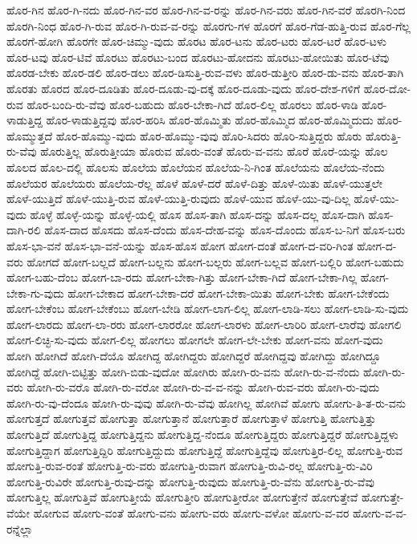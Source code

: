 {ಹೊರ-ಗಿನ
ಹೊರ-ಗಿ-ನದು
ಹೊರ-ಗಿನ-ವರ
ಹೊರ-ಗಿನ-ವ-ರನ್ನು
ಹೊರ-ಗಿನ-ವರು
ಹೊರ-ಗಿನ-ವರೆ
ಹೊರಗಿ-ನಿಂದ
ಹೊರಗಿ-ನಿಂಧ
ಹೊರ-ಗಿ-ರುವ
ಹೊರ-ಗಿ-ರುವ-ವ-ರನ್ನು
ಹೊರಗು-ಗಳ
ಹೊರಗೆ
ಹೊರ-ಗೆಡ-ಹುತ್ತಿ-ರುವ
ಹೊರ-ಗೆಲ್ಲ
ಹೊರಗೆ-ಹೋಗಿ
ಹೊರಗೇ
ಹೊರ-ಚಿಮ್ಮು-ವುದು
ಹೊರಟ
ಹೊರ-ಟನು
ಹೊರ-ಟರು
ಹೊರ-ಟರೆ
ಹೊರ-ಟಳು
ಹೊರ-ಟವು
ಹೊರ-ಟಿವೆ
ಹೊರಟು
ಹೊರಟು-ಬಂದ
ಹೊರಟು-ಹೋದನು
ಹೊರಟು-ಹೋಯಿತು
ಹೊರ-ಟೆವು
ಹೊರಡ-ಬೇಕು
ಹೊರ-ಡಲಿ
ಹೊರ-ಡಲು
ಹೊರ-ಡಿಸುತ್ತಿ-ರುವ-ವಳು
ಹೊರ-ಡುತ್ತೀರಿ
ಹೊರ-ಡು-ವನು
ಹೊರ-ತಾಗಿ
ಹೊರತು
ಹೊರದ
ಹೊರ-ದೂಡಿತು
ಹೊರ-ದೂಡು-ವು-ದಕ್ಕೆ
ಹೊರ-ದೂಡು-ವುದು
ಹೊರ-ದೇಶ-ಗಳಿಗೆ
ಹೊರ-ದೋ-ರುವ
ಹೊರ-ಬಂದಿ-ರು-ವೆವು
ಹೊರ-ಬಹುದು
ಹೊರ-ಬೇಕಾ-ಗಿದೆ
ಹೊರ-ಲಿಲ್ಲ
ಹೊರಲು
ಹೊರ-ಳಾಡಿ
ಹೊರ-ಳಾಡುತ್ತಿದ್ದ
ಹೊರ-ಳಾಡುತ್ತಿದ್ದವು
ಹೊರ-ಹರಿಸಿ
ಹೊರ-ಹೊಮ್ಮಿತು
ಹೊರ-ಹೊಮ್ಮಿದ
ಹೊರ-ಹೊಮ್ಮಿದುದು
ಹೊರ-ಹೊಮ್ಮುತ್ತದೆ
ಹೊರ-ಹೊಮ್ಮು-ವುದು
ಹೊರ-ಹೊಮ್ಮು-ವುವು
ಹೊರಿ-ಸಿದರು
ಹೊರಿ-ಸುತ್ತಿದ್ದರು
ಹೊರು
ಹೊರುತ್ತಿ-ರು-ವೆವು
ಹೊರುತ್ತಿಲ್ಲ
ಹೊರುತ್ತೀಯಾ
ಹೊರುವ
ಹೊರು-ವಂತೆ
ಹೊರು-ವ-ವನು
ಹೊರೆ
ಹೊರೆ-ಯನ್ನು
ಹೊಲ
ಹೊಲದ
ಹೊಲ-ದಲ್ಲಿ
ಹೊಲಸು
ಹೊಲೆಯ
ಹೊಲೆಯನ
ಹೊಲೆಯ-ನಿ-ಗಿಂತ
ಹೊಲೆಯನು
ಹೊಲೆಯ-ನೆಂದು
ಹೊಲೆಯರ
ಹೊಲೆಯರು
ಹೊಲೆಯ-ರೆಲ್ಲ
ಹೊಳೆ
ಹೊಳೆ-ದರೆ
ಹೊಳೆ-ದಿತ್ತು
ಹೊಳೆ-ಯಿತು
ಹೊಳೆ-ಯುತ್ತಲೇ
ಹೊಳೆ-ಯುತ್ತಿದೆ
ಹೊಳೆ-ಯುತ್ತಿ-ರುವ
ಹೊಳೆ-ಯುತ್ತಿ-ರುವುದು
ಹೊಳೆ-ಯುವ
ಹೊಳೆ-ಯು-ವು-ದಿಲ್ಲ
ಹೊಳೆ-ಯು-ವುದು
ಹೊಳ್ಳೆ
ಹೊಳ್ಳೆ-ಯನ್ನು
ಹೊಳ್ಳೆ-ಯಲ್ಲಿ
ಹೊಸ
ಹೊಸ-ತಾಗಿ
ಹೊಸ-ದನ್ನು
ಹೊಸ-ದಲ್ಲ
ಹೊಸ-ದಾಗಿ
ಹೊಸ-ದಾಗಿ-ರಲಿ
ಹೊಸ-ದಾದ
ಹೊಸದು
ಹೊಸ-ದೆಂದು
ಹೊಸ-ದೇಹ-ವನ್ನು
ಹೊಸ-ದೊಂದು
ಹೊಸ-ಬ-ನಿಗೆ
ಹೊಸ-ಬರು
ಹೊಸ-ಭಾ-ವನೆ
ಹೊಸ-ಭಾ-ವನೆ-ಯನ್ನು
ಹೊಸ-ಹೊಸ
ಹೋಗ
ಹೋಗ-ದಂತೆ
ಹೋಗ-ದ-ವರಿ-ಗಿಂತ
ಹೋಗ-ದ-ವರು
ಹೋಗದೆ
ಹೋಗ-ಬಲ್ಲದೆ
ಹೋಗ-ಬಲ್ಲನು
ಹೋಗ-ಬಲ್ಲರು
ಹೋಗ-ಬಲ್ಲವ
ಹೋಗ-ಬಲ್ಲಿರಿ
ಹೋಗ-ಬಹುದು
ಹೋಗ-ಬಹು-ದೆಂಬ
ಹೋಗ-ಬಾ-ರದು
ಹೋಗ-ಬೇಕಾ-ಗಿತ್ತು
ಹೋಗ-ಬೇಕಾ-ಗಿದೆ
ಹೋಗ-ಬೇಕಾ-ಗಿಲ್ಲ
ಹೋಗ-ಬೇಕಾ-ಗು-ವುದು
ಹೋಗ-ಬೇಕಾದ
ಹೋಗ-ಬೇಕಾ-ದರೆ
ಹೋಗ-ಬೇಕಾ-ಯಿತು
ಹೋಗ-ಬೇಕು
ಹೋಗ-ಬೇಕೆಂದು
ಹೋಗ-ಬೇಕೆಂಬ
ಹೋಗ-ಬೇಕೆಂಬು
ಹೋಗ-ಬೇಡಿ
ಹೋಗ-ಲಾಗ-ಲಿಲ್ಲ
ಹೋಗ-ಲಾಡಿ-ಸಲು
ಹೋಗ-ಲಾಡಿ-ಸು-ವುದು
ಹೋಗ-ಲಾರದು
ಹೋಗ-ಲಾ-ರರು
ಹೋಗ-ಲಾರರೋ
ಹೋಗ-ಲಾರಳು
ಹೋಗ-ಲಾರಿರಿ
ಹೋಗ-ಲಾರೆವು
ಹೋಗಲಿ
ಹೋಗ-ಲಿಚ್ಛಿ-ಸು-ವುದು
ಹೋಗ-ಲಿಲ್ಲ
ಹೋಗಲು
ಹೋಗಲೇ
ಹೋಗ-ಲೇ-ಬೇಕು
ಹೋಗ-ವನು
ಹೋಗ-ವುದು
ಹೋಗಿ
ಹೋಗಿದೆ
ಹೋಗಿ-ದೆಯೊ
ಹೋಗಿದ್ದ
ಹೋಗಿದ್ದರು
ಹೋಗಿದ್ದರೆ
ಹೋಗಿದ್ದವು
ಹೋಗಿದ್ದು
ಹೋಗಿದ್ದೂ
ಹೋಗಿದ್ದೆ
ಹೋಗಿ-ಬಿಟ್ಟಿತ್ತು
ಹೋಗಿ-ಬಿಡು-ವುದೋ
ಹೋಗಿರು
ಹೋಗಿ-ರು-ವನು
ಹೋಗಿ-ರು-ವ-ನೆಂದು
ಹೋಗಿ-ರು-ವರು
ಹೋಗಿ-ರು-ವರೊ
ಹೋಗಿ-ರು-ವರೋ
ಹೋಗಿ-ರು-ವ-ವ-ನನ್ನು
ಹೋಗಿ-ರುವ-ವರು
ಹೋಗಿ-ರು-ವುದು
ಹೋಗಿ-ರು-ವು-ದೆಂದೂ
ಹೋಗಿ-ರು-ವುವು
ಹೋಗಿ-ರು-ವೆವು
ಹೋಗಿಲ್ಲ
ಹೋಗಿವೆ
ಹೋಗು
ಹೋಗು-ತಿ-ತ-ರು-ವನು
ಹೋಗುತ್ತದೆ
ಹೋಗುತ್ತವೆ
ಹೋಗುತ್ತಾ
ಹೋಗುತ್ತಾನೆ
ಹೋಗುತ್ತಾರೆ
ಹೋಗುತ್ತಾಳೆ
ಹೋಗುತ್ತಿ
ಹೋಗುತ್ತಿತ್ತು
ಹೋಗುತ್ತಿದೆ
ಹೋಗುತ್ತಿದ್ದ
ಹೋಗುತ್ತಿದ್ದನು
ಹೋಗುತ್ತಿದ್ದ-ನೆಂದೂ
ಹೋಗುತ್ತಿದ್ದರು
ಹೋಗುತ್ತಿದ್ದರೆ
ಹೋಗುತ್ತಿದ್ದಳು
ಹೋಗುತ್ತಿದ್ದಾಗ
ಹೋಗುತ್ತಿದ್ದಿರಿ
ಹೋಗುತ್ತಿದ್ದುದು
ಹೋಗುತ್ತಿದ್ದೆ
ಹೋಗುತ್ತಿದ್ದೆವು
ಹೋಗುತ್ತಿರ-ಲಿಲ್ಲ
ಹೋಗುತ್ತಿ-ರುವ
ಹೋಗುತ್ತಿ-ರುವ-ರಂತೆ
ಹೋಗುತ್ತಿ-ರು-ವರು
ಹೋಗುತ್ತಿ-ರುವಾಗ
ಹೋಗುತ್ತಿ-ರುವಿ-ರಲ್ಲ
ಹೋಗುತ್ತಿ-ರು-ವಿರಿ
ಹೋಗುತ್ತಿ-ರುವಿರೇ
ಹೋಗುತ್ತಿ-ರುವು-ದನ್ನು
ಹೋಗುತ್ತಿ-ರುವುದು
ಹೋಗುತ್ತಿ-ರು-ವೆನು
ಹೋಗುತ್ತಿ-ರು-ವೆವು
ಹೋಗುತ್ತಿಲ್ಲ
ಹೋಗುತ್ತಿವೆ
ಹೋಗುತ್ತೀಯೆ
ಹೋಗುತ್ತೀರಿ
ಹೋಗುತ್ತೀರೋ
ಹೋಗುತ್ತೇನೆ
ಹೋಗುತ್ತೇವೆ
ಹೋಗುತ್ತೇ-ವೆಯೇ
ಹೋಗುವ
ಹೋಗು-ವಂತೆ
ಹೋಗು-ವನು
ಹೋಗು-ವರು
ಹೋಗು-ವಳೋ
ಹೋಗು-ವ-ವರ
ಹೋಗು-ವ-ವ-ರನ್ನೆಲ್ಲಾ
}
